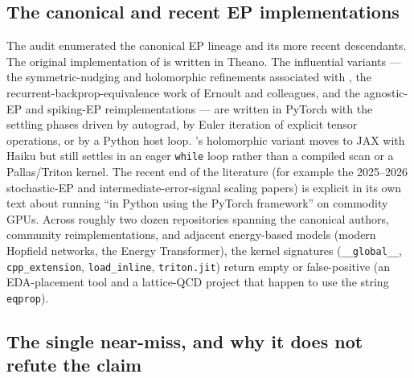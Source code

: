 \subsection{The canonical and recent EP implementations}

The audit enumerated the canonical EP lineage and its more recent descendants. The original
implementation of \citet{scellier2017ep} is written in Theano. The influential variants ---
the symmetric-nudging and holomorphic refinements associated with \citet{laborieux2021ep},
the recurrent-backprop-equivalence work of Ernoult and colleagues, and the agnostic-EP and
spiking-EP reimplementations --- are written in PyTorch with the settling phases driven by
autograd, by Euler iteration of explicit tensor operations, or by a Python host loop.
\citet{laborieux2021ep}'s holomorphic variant moves to JAX with Haiku but still settles in
an eager \texttt{while} loop rather than a compiled scan or a Pallas/Triton kernel. The
recent end of the literature (for example the 2025--2026 stochastic-EP and
intermediate-error-signal scaling papers) is explicit in its own text about running ``in
Python using the PyTorch framework'' on commodity GPUs. Across roughly two dozen repositories
spanning the canonical authors, community reimplementations, and adjacent energy-based
models (modern Hopfield networks, the Energy Transformer), the kernel signatures
(\texttt{\_\_global\_\_}, \texttt{cpp\_extension}, \texttt{load\_inline}, \texttt{triton.jit})
return empty or false-positive (an EDA-placement tool and a lattice-QCD project that happen
to use the string \texttt{eqprop}).

\subsection{The single near-miss, and why it does not refute the claim}


